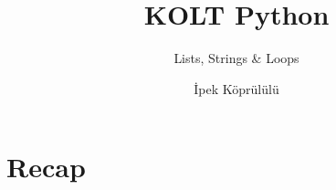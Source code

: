 
\usepackage{../KU-Beamer-Template/style/koc} 
\usepackage{minted}
\usepackage{upquote}
\usepackage{graphicx}

\title{KOLT Python} 
\subtitle{Lists, Strings \& Loops} 
\date{}
\author{İpek Köprülülü}




    \maketitle


    \section{Recap}

